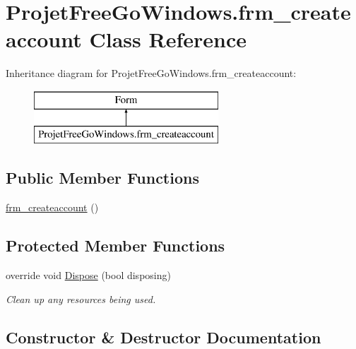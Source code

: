 \hypertarget{class_projet_free_go_windows_1_1frm__createaccount}{}\section{Projet\+Free\+Go\+Windows.\+frm\+\_\+createaccount Class Reference}
\label{class_projet_free_go_windows_1_1frm__createaccount}
Inheritance diagram for Projet\+Free\+Go\+Windows.\+frm\+\_\+createaccount\+:\begin{figure}[H]
\begin{center}
\leavevmode
\includegraphics[height=2.000000cm]{class_projet_free_go_windows_1_1frm__createaccount}
\end{center}
\end{figure}
\subsection*{Public Member Functions}
\begin{DoxyCompactItemize}
\item 
\hyperlink{class_projet_free_go_windows_1_1frm__createaccount_a270e9fc81773145b6c865616e68206bc}{frm\+\_\+createaccount} ()
\end{DoxyCompactItemize}
\subsection*{Protected Member Functions}
\begin{DoxyCompactItemize}
\item 
override void \hyperlink{class_projet_free_go_windows_1_1frm__createaccount_ae4434d178daa39bcdcef1f6119e81486}{Dispose} (bool disposing)
\begin{DoxyCompactList}\small\item\em Clean up any resources being used. \end{DoxyCompactList}\end{DoxyCompactItemize}


\subsection{Constructor \& Destructor Documentation}
\mbox{\label{class_projet_free_go_windows_1_1frm__createaccount_a270e9fc81773145b6c865616e68206bc}} 
